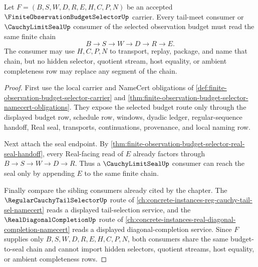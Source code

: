 \begin{theorem}
\label{thm:finite-observation-budget-selector-tail-meet-seal-compatibility}
Let $F=(B,S,W,D,R,E,H,C,P,N)$ be an accepted $\FiniteObservationBudgetSelectorUp$ carrier. Every tail-meet consumer or $\CauchyLimitSealUp$ consumer of the selected observation budget must read the same finite chain
$$
B \to S \to W \to D \to R \to E.
$$
The consumer may use $H,C,P,N$ to transport, replay, package, and name that chain, but no hidden selector, quotient stream, host equality, or ambient completeness row may replace any segment of the chain.
\end{theorem}
\begin{proof}
First use the local carrier and NameCert obligations of \autoref{def:finite-observation-budget-selector-carrier} and \autoref{thm:finite-observation-budget-selector-namecert-obligations}. They expose the selected budget route only through the displayed budget row, schedule row, windows, dyadic ledger, regular-sequence handoff, Real seal, transports, continuations, provenance, and local naming row.

Next attach the seal endpoint. By \autoref{thm:finite-observation-budget-selector-real-seal-handoff}, every Real-facing read of $E$ already factors through $B \to S \to W \to D \to R$. Thus a $\CauchyLimitSealUp$ consumer can reach the seal only by appending $E$ to the same finite chain.

Finally compare the sibling consumers already cited by the chapter. The $\RegularCauchyTailSelectorUp$ route of \autoref{ch:concrete-instances-reg-cauchy-tail-sel-namecert} reads a displayed tail-selection service, and the $\RealDiagonalCompletionUp$ route of \autoref{ch:concrete-instances-real-diagonal-completion-namecert} reads a displayed diagonal-completion service. Since $F$ supplies only $B,S,W,D,R,E,H,C,P,N$, both consumers share the same budget-to-seal chain and cannot import hidden selectors, quotient streams, host equality, or ambient completeness rows.
\end{proof}

